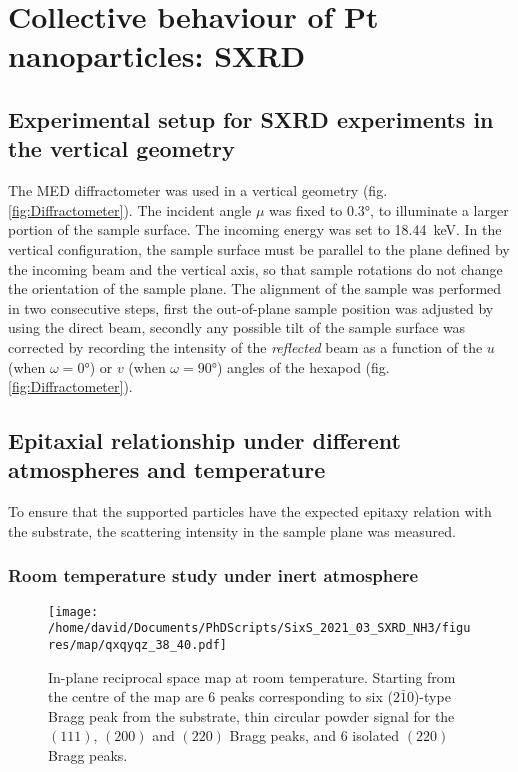 \section{Collective behaviour of Pt nanoparticles: SXRD}

\subsection{Experimental setup for SXRD experiments in the vertical geometry}\label{sec:SXRDSetupV}

The MED diffractometer was used in a vertical geometry (fig. \ref{fig:Diffractometer}).
The incident angle $\mu$ was fixed to \ang{0.3}, to illuminate a larger portion of the sample surface.
The incoming energy was set to \qty{18.44}{\keV}.
In the vertical configuration, the sample surface must be parallel to the plane defined by the incoming beam and the vertical axis, so that sample rotations do not change the orientation of the sample plane.
The alignment of the sample was performed in two consecutive steps, first the out-of-plane sample position was adjusted by using the direct beam, secondly any possible tilt of the sample surface was corrected by recording the intensity of the \textit{reflected} beam as a function of the $u$ (when $\omega=\ang{0}$) or $v$ (when $\omega=\ang{90}$) angles of the hexapod (fig. \ref{fig:Diffractometer}).

\subsection{Epitaxial relationship under different atmospheres and temperature}

To ensure that the  supported particles have the expected epitaxy relation with the substrate, the scattering intensity in the sample plane was measured.

\subsubsection{Room temperature study under inert atmosphere}

\begin{figure}[!htb]
    \centering
    \texttt{[image: /home/david/Documents/PhDScripts/SixS\_2021\_03\_SXRD\_NH3/figures/map/qxqyqz\_38\_40.pdf]}
    \caption{
        In-plane reciprocal space map at room temperature.
        Starting from the centre of the map are 6 peaks corresponding to six ($2\bar{1}0$)-type Bragg peak from the substrate, thin circular powder signal for the $(111)$, $(200)$ and $(220)$ Bragg peaks, and 6 isolated $(220)$ Bragg peaks.
    }
    \label{fig:QxQyMap}
\end{figure}

